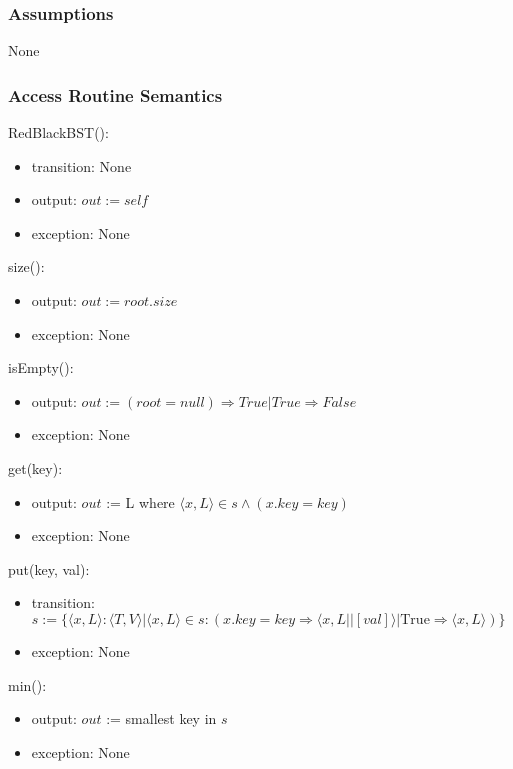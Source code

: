 \documentclass[12pt]{article}
\begin{document}
\subsubsection* {Assumptions}

None

\subsubsection* {Access Routine Semantics}

RedBlackBST():
\begin{itemize}
\item transition: None
\item output: $out := \mathit{self}$
\item exception: None
\end{itemize}

\noindent size():
\begin{itemize}
\item output: $out := root.size$
\item exception: None
\end{itemize}

\noindent isEmpty():
\begin{itemize}
\item output: $out := (root = null) \Rightarrow True | True \Rightarrow False$
\item exception: None
\end{itemize}

\noindent get(key):
\begin{itemize}
\item output: $out$ := L where $\langle x, L \rangle \in s \wedge (x.key = \mathit{key})$
\item exception: None
\end{itemize}

\noindent put(key, val):
\begin{itemize}
\item transition: $s := \{ \langle x, L \rangle : \langle T, V \rangle |
  \langle x, L \rangle \in s : (x.key = \mathit{key} \Rightarrow \langle x, L || [val] \rangle
   | \text{True} \Rightarrow \langle x, L \rangle) \}$

\item exception: None
\end{itemize}

\noindent min():
\begin{itemize}
\item output: $out$ := smallest key in $s$
\item exception: None
\end{itemize}
\end{document}
